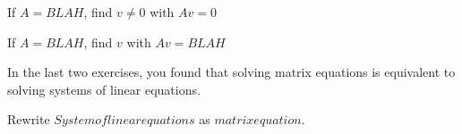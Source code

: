 \documentclass{ximera}
\begin{document}
\begin{question}
  If $A = BLAH$, find $v \neq 0$ with $Av = 0$ 
\end{question}
	
\begin{question}
  If $A = BLAH$, find $v$ with $Av = BLAH$ 
\end{question}
	
In the last two exercises, you found that solving matrix equations is equivalent to solving systems of linear equations.

\begin{question}
  Rewrite  $System of linear equations$ as $matrix equation$.
\end{question}
\end{document}
